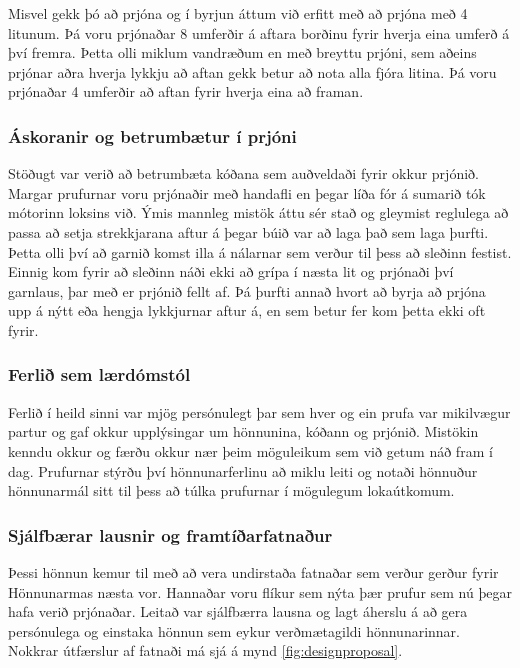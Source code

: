 Misvel gekk þó að prjóna og í byrjun áttum við erfitt með að prjóna með 4 litunum. Þá voru prjónaðar 8 umferðir á aftara borðinu fyrir hverja eina umferð á því fremra. Þetta olli miklum vandræðum en með breyttu prjóni, sem aðeins prjónar aðra hverja lykkju að aftan gekk betur að nota alla fjóra litina. Þá  voru prjónaðar 4 umferðir að aftan fyrir hverja eina að framan. 
\subsubsection{Áskoranir og betrumbætur í prjóni}
Stöðugt var verið að betrumbæta kóðana sem auðveldaði fyrir okkur prjónið. Margar prufurnar voru prjónaðir með handafli en þegar líða fór á sumarið tók mótorinn loksins við. Ýmis mannleg mistök áttu sér stað og gleymist reglulega að passa að setja strekkjarana aftur á þegar búið var að laga það sem laga þurfti. Þetta olli því að garnið komst illa á nálarnar sem verður til þess að sleðinn festist. Einnig kom fyrir að sleðinn náði ekki að grípa í næsta lit og prjónaði því garnlaus, þar með er prjónið fellt af. Þá þurfti annað hvort að byrja að prjóna upp á nýtt eða hengja lykkjurnar aftur á, en sem betur fer kom þetta ekki oft fyrir. 
\subsubsection{Ferlið sem lærdómstól}
Ferlið í heild sinni var mjög persónulegt þar sem hver og ein prufa var mikilvægur partur og gaf okkur upplýsingar um hönnunina, kóðann og prjónið. Mistökin kenndu okkur og færðu okkur nær þeim möguleikum sem við getum náð fram í dag. Prufurnar stýrðu því hönnunarferlinu að miklu leiti og notaði hönnuður hönnunarmál sitt til þess að túlka prufurnar í mögulegum lokaútkomum. 
\subsubsection{Sjálfbærar lausnir og framtíðarfatnaður}
Þessi hönnun kemur til með að vera undirstaða fatnaðar sem verður gerður fyrir Hönnunarmas næsta vor. Hannaðar voru flíkur sem nýta þær prufur sem nú þegar hafa verið prjónaðar. Leitað var sjálfbærra lausna og lagt áherslu á að gera persónulega og einstaka hönnun sem eykur verðmætagildi hönnunarinnar. Nokkrar útfærslur af fatnaði má sjá á mynd \ref{fig:designproposal}.

